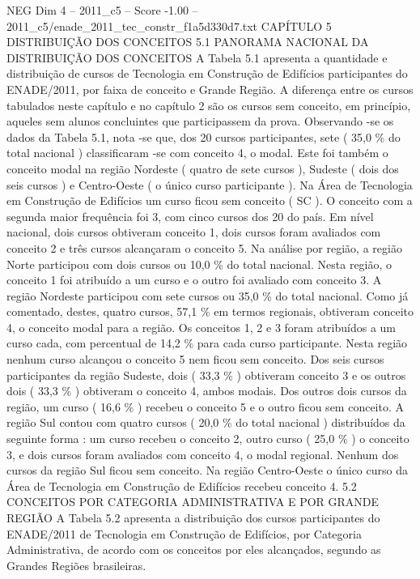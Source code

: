 \begin{textsample}{NEG Dim 4 – 2011\_c5 – Score -1.00 – 2011\_c5/enade\_2011\_tec\_constr\_f1a5d330d7.txt}  \label{ex:f4_neg_118}
CAPÍTULO 5 DISTRIBUIÇÃO DOS CONCEITOS 5.1 PANORAMA NACIONAL DA DISTRIBUIÇÃO DOS CONCEITOS A Tabela 5.1 apresenta a quantidade e distribuição de cursos de Tecnologia em Construção de Edifícios participantes do ENADE/2011, por faixa de conceito e Grande Região.
A diferença entre os cursos tabulados neste capítulo e no capítulo 2 são os cursos sem conceito, em princípio, aqueles sem alunos concluintes que participassem da prova.
Observando -se os dados da Tabela 5.1, nota -se que, dos 20 cursos participantes, sete ( 35,0 \% do total nacional ) classificaram -se com conceito 4, o modal.
Este foi também o conceito modal na região Nordeste ( quatro de sete cursos ), Sudeste ( dois dos seis cursos ) e Centro-Oeste ( o único curso participante ).
Na Área de Tecnologia em Construção de Edifícios um curso ficou sem conceito ( SC ).
O conceito com a segunda maior frequência foi 3, com cinco cursos dos 20 do país.
Em nível nacional, dois cursos obtiveram conceito 1, dois cursos foram avaliados com conceito 2 e três cursos alcançaram o conceito 5.
Na análise por região, a região Norte participou com dois cursos ou 10,0 \% do total nacional.
Nesta região, o conceito 1 foi atribuído a um curso e o outro foi avaliado com conceito 3.
A região Nordeste participou com sete cursos ou 35,0 \% do total nacional.
Como já comentado, destes, quatro cursos, 57,1 \% em termos regionais, obtiveram conceito 4, o conceito modal para a região.
Os conceitos 1, 2 e 3 foram atribuídos a um curso cada, com percentual de 14,2 \% para cada curso participante.
Nesta região nenhum curso alcançou o conceito 5 nem ficou sem conceito.
Dos seis cursos participantes da região Sudeste, dois ( 33,3 \% ) obtiveram conceito 3 e os outros dois ( 33,3 \% ) obtiveram o conceito 4, ambos modais.
Dos outros dois cursos da região, um curso ( 16,6 \% ) recebeu o conceito 5 e o outro ficou sem conceito.
A região Sul contou com quatro cursos ( 20,0 \% do total nacional ) distribuídos da seguinte forma : um curso recebeu o conceito 2, outro curso ( 25,0 \% ) o conceito 3, e dois cursos foram avaliados com conceito 4, o modal regional.
Nenhum dos cursos da região Sul ficou sem conceito.
Na região Centro-Oeste o único curso da Área de Tecnologia em Construção de Edifícios recebeu conceito 4. 5.2 CONCEITOS POR CATEGORIA ADMINISTRATIVA E POR GRANDE REGIÃO A Tabela 5.2 apresenta a distribuição dos cursos participantes do ENADE/2011 de Tecnologia em Construção de Edifícios, por Categoria Administrativa, de acordo com os conceitos por eles alcançados, segundo as Grandes Regiões brasileiras.

\end{textsample}
